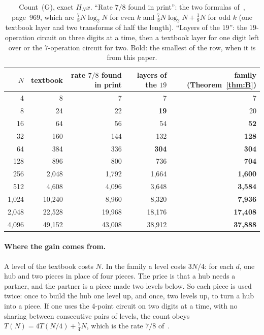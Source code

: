 \documentclass[10pt]{article}
\theoremstyle{remark}
\newcommand{\cntG}{\textup{(G)}}
\renewcommand{\lg}{\log_2}
\begin{document}
\begin{table}[!htb]
\centering
\small
\begin{tabular}{@{}rrrrr@{}}
\toprule
$N$ & textbook & rate $7/8$ found in print & layers of the $19$ & family (Theorem~\ref{thm:B})\\
\midrule
4 & 8 & 7 & 7 & 7\\
8 & 24 & 22 & \textbf{19} & 20\\
16 & 64 & 56 & 54 & \textbf{52}\\
32 & 160 & 144 & 132 & \textbf{128}\\
64 & 384 & 336 & \textbf{304} & \textbf{304}\\
128 & 896 & 800 & 736 & \textbf{704}\\
256 & 2,048 & 1,792 & 1,664 & \textbf{1,600}\\
512 & 4,608 & 4,096 & 3,648 & \textbf{3,584}\\
1,024 & 10,240 & 8,960 & 8,320 & \textbf{7,936}\\
2,048 & 22,528 & 19,968 & 18,176 & \textbf{17,408}\\
4,096 & 49,152 & 43,008 & 38,912 & \textbf{37,888}\\
\bottomrule
\end{tabular}
\caption{Count~\cntG, exact $H_Nx$. ``Rate $7/8$ found in print'': the two formulas of~\cite{CFL}, page~969, which are
$\tfrac78N\lg N$ for even $k$ and $\tfrac78N\lg N+\tfrac18N$ for odd $k$ (one textbook layer and two
transforms of half the length). ``Layers of the $19$'': the $19$-operation circuit on three digits
at a time, then a textbook layer for one digit left over or the $7$-operation circuit for two. Bold: the
smallest of the row, when it is from this paper.}
\label{tab:G}
\end{table}

\paragraph{Where the gain comes from.}
A level of the textbook costs $N$. In the family a level costs $3N/4$: for each $d$, one hub and two pieces
in place of four pieces. The price is that a hub needs a partner, and the partner is a piece made two levels
below. So each piece is used twice: once to build the hub one level up, and once, two levels up, to turn a
hub into a piece. If one uses the $4$-point circuit on two digits at a time, with no sharing between
consecutive pairs of levels, the count obeys $T(N)=4T(N/4)+\tfrac74N$, which is the rate $7/8$
of~\cite{CFL}.
\end{document}
